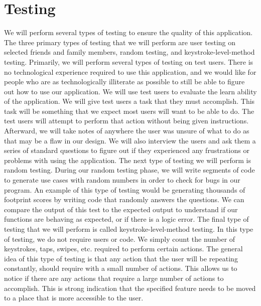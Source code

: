 \documentclass[onecolumn, draftclsnofoot,10pt, compsoc, tikz]{IEEEtran}
\begin{document}
\section{Testing}
We will perform several types of testing to ensure the quality of this application. The three primary types of testing that we will perform are user testing on selected friends and family members, random testing, and keystroke-level-method testing. Primarily, we will perform several types of testing on test users. There is no technological experience required to use this application, and we would like for people who are as technologically illiterate as possible to still be able to figure out how to use our application. We will use test users to evaluate the learn ability of the application. We will give test users a task that they must accomplish. This task will be something that we expect most users will want to be able to do. The test users will attempt to perform that action without being given instructions. Afterward, we will take notes of anywhere the user was unsure of what to do as that may be a flaw in our design. We will also interview the users and ask them a series of standard questions to figure out if they experienced any frustrations or problems with using the application. The next type of testing we will perform is random testing. During our random testing phase, we will write segments of code to generate use cases with random numbers in order to check for bugs in our program. An example of this type of testing would be generating thousands of footprint scores by writing code that randomly answers the questions. We can compare the output of this test to the expected output to understand if our functions are behaving as expected, or if there is a logic error. The final type of testing that we will perform is called keystroke-level-method testing. In this type of testing, we do not require users or code. We simply count the number of keystrokes, taps, swipes, etc. required to perform certain actions. The general idea of this type of testing is that any action that the user will be repeating constantly, should require with a small number of actions. This allows us to notice if there are any actions that require a large number of actions to accomplish. This is strong indication that the specified feature needs to be moved to a place that is more accessible to the user.

\clearpage
\end{document}
